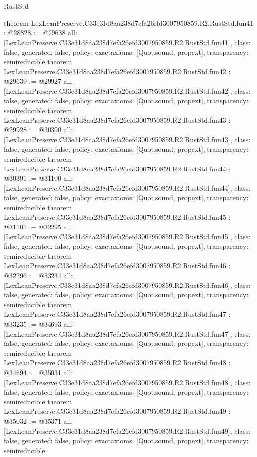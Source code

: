 \begin{lexlean}{RustStd}
\begin{coremodule}
{}
theorem LexLeanPreserve.C33e31d8aa238d7efa26efd3007950859.R2.RustStd.fun41 : @28828 := @29638 {
  all: [LexLeanPreserve.C33e31d8aa238d7efa26efd3007950859.R2.RustStd.fun41],
  class: false,
  generated: false,
  policy: exact{axioms: [Quot.sound, propext]},
  transparency: semireducible
}
theorem LexLeanPreserve.C33e31d8aa238d7efa26efd3007950859.R2.RustStd.fun42 : @29639 := @29927 {
  all: [LexLeanPreserve.C33e31d8aa238d7efa26efd3007950859.R2.RustStd.fun42],
  class: false,
  generated: false,
  policy: exact{axioms: [Quot.sound, propext]},
  transparency: semireducible
}
theorem LexLeanPreserve.C33e31d8aa238d7efa26efd3007950859.R2.RustStd.fun43 : @29928 := @30390 {
  all: [LexLeanPreserve.C33e31d8aa238d7efa26efd3007950859.R2.RustStd.fun43],
  class: false,
  generated: false,
  policy: exact{axioms: [Quot.sound, propext]},
  transparency: semireducible
}
theorem LexLeanPreserve.C33e31d8aa238d7efa26efd3007950859.R2.RustStd.fun44 : @30391 := @31100 {
  all: [LexLeanPreserve.C33e31d8aa238d7efa26efd3007950859.R2.RustStd.fun44],
  class: false,
  generated: false,
  policy: exact{axioms: [Quot.sound, propext]},
  transparency: semireducible
}
theorem LexLeanPreserve.C33e31d8aa238d7efa26efd3007950859.R2.RustStd.fun45 : @31101 := @32295 {
  all: [LexLeanPreserve.C33e31d8aa238d7efa26efd3007950859.R2.RustStd.fun45],
  class: false,
  generated: false,
  policy: exact{axioms: [Quot.sound, propext]},
  transparency: semireducible
}
theorem LexLeanPreserve.C33e31d8aa238d7efa26efd3007950859.R2.RustStd.fun46 : @32296 := @33234 {
  all: [LexLeanPreserve.C33e31d8aa238d7efa26efd3007950859.R2.RustStd.fun46],
  class: false,
  generated: false,
  policy: exact{axioms: [Quot.sound, propext]},
  transparency: semireducible
}
theorem LexLeanPreserve.C33e31d8aa238d7efa26efd3007950859.R2.RustStd.fun47 : @33235 := @34693 {
  all: [LexLeanPreserve.C33e31d8aa238d7efa26efd3007950859.R2.RustStd.fun47],
  class: false,
  generated: false,
  policy: exact{axioms: [Quot.sound, propext]},
  transparency: semireducible
}
theorem LexLeanPreserve.C33e31d8aa238d7efa26efd3007950859.R2.RustStd.fun48 : @34694 := @35031 {
  all: [LexLeanPreserve.C33e31d8aa238d7efa26efd3007950859.R2.RustStd.fun48],
  class: false,
  generated: false,
  policy: exact{axioms: [Quot.sound, propext]},
  transparency: semireducible
}
theorem LexLeanPreserve.C33e31d8aa238d7efa26efd3007950859.R2.RustStd.fun49 : @35032 := @35371 {
  all: [LexLeanPreserve.C33e31d8aa238d7efa26efd3007950859.R2.RustStd.fun49],
  class: false,
  generated: false,
  policy: exact{axioms: [Quot.sound, propext]},
  transparency: semireducible
}
\end{coremodule}
\end{lexlean}
